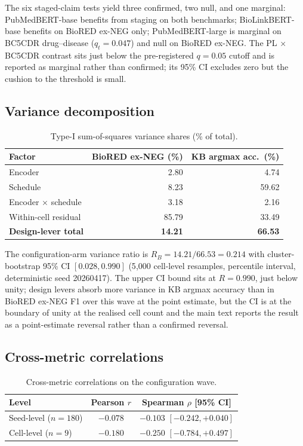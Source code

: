 The six staged-claim tests yield three confirmed, two null, and one
marginal: PubMedBERT-base benefits from staging on both benchmarks;
BioLinkBERT-base benefits on BioRED ex-NEG only; PubMedBERT-large
is marginal on BC5CDR drug--disease ($q_t = 0.047$) and null on
BioRED ex-NEG. The PL $\times$ BC5CDR contrast sits just below the
pre-registered $q = 0.05$ cutoff and is reported as marginal rather
than confirmed; its 95\% CI excludes zero but the cushion to the
threshold is small.

\subsection{Variance decomposition}

\begin{table}[H]
\centering
\caption{Type-I sum-of-squares variance shares (\% of total).}
\label{tab:s6-vardecomp}
\small
\begin{tabular}{@{}lrr@{}}
\toprule
\textbf{Factor} & \textbf{BioRED ex-NEG (\%)} & \textbf{KB argmax acc.\ (\%)} \\
\midrule
Encoder                       & 2.80   & 4.74   \\
Schedule                      & 8.23   & 59.62  \\
Encoder $\times$ schedule     & 3.18   & 2.16   \\
Within-cell residual          & 85.79  & 33.49  \\
\midrule
\textbf{Design-lever total}   & \textbf{14.21} & \textbf{66.53} \\
\bottomrule
\end{tabular}
\end{table}

The configuration-arm variance ratio is
$R_B = 14.21 / 66.53 = 0.214$ with cluster-bootstrap 95\% CI
$[0.028, 0.990]$ (5{,}000 cell-level resamples, percentile interval,
deterministic seed 20260417). The upper CI bound sits at $R = 0.990$,
just below unity; design levers absorb more variance in KB argmax
accuracy than in BioRED ex-NEG F1 over this wave at the point
estimate, but the CI is at the boundary of unity at the realised
cell count and the main text reports the result as a point-estimate
reversal rather than a confirmed reversal.

\subsection{Cross-metric correlations}

\begin{table}[H]
\centering
\caption{Cross-metric correlations on the configuration wave.}
\label{tab:s6-corr}
\small
\begin{tabular}{@{}lcc@{}}
\toprule
\textbf{Level} & \textbf{Pearson $r$} & \textbf{Spearman $\rho$ [95\% CI]} \\
\midrule
Seed-level ($n = 180$) & $-0.078$ & $-0.103$ $[-0.242, +0.040]$ \\
Cell-level ($n = 9$)   & $-0.180$ & $-0.250$ $[-0.784, +0.497]$ \\
\bottomrule
\end{tabular}
\end{table}

